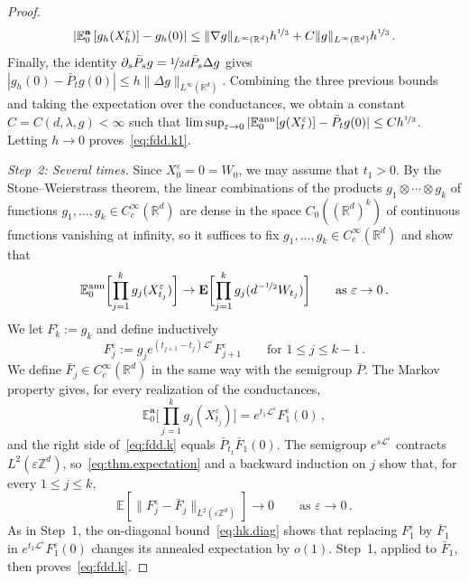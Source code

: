 \documentclass[11pt]{amsart}
\numberwithin{equation}{section}
\newcommand{\Z}{\mathbb{Z}}
\newcommand{\R}{\mathbb{R}}
\newcommand{\E}{\mathbb{E}}
\newcommand{\ba}{\mathbf{a}}
\newcommand{\eps}{\varepsilon}
\newcommand{\Leps}{\mathcal{L}^\varepsilon}
\newcommand{\nf}{\nicefrac}
\begin{document}
\begin{proof}
\begin{equation*}
    \left| \E^\ba_0 \left[ g_h(X^\eps_h) \right] - g_h(0) \right| \leq \|\nabla g\|_{L^\infty(\R^d)} h^{\nf13} + C \|g\|_{L^\infty(\R^d)} h^{\nf13}\,.
\end{equation*}
Finally, the identity $\partial_s \bar P_s g = \nf{1}{2d} \bar P_s \Delta g$ gives $|g_h(0) - \bar P_t g(0)| \leq h \|\Delta g\|_{L^\infty(\R^d)}$.
Combining the three previous bounds and taking the expectation over the conductances, we obtain a constant $C = C(d, \lambda, g) < \infty$ such that $\limsup_{\eps \to 0} | \E^{\mathrm{ann}}_0 [ g(X^\eps_t) ] - \bar P_t g(0) | \leq C h^{\nf13}$.
Letting $h \to 0$ proves~\eqref{eq:fdd.k1}.

\smallskip

\emph{Step~2: Several times.}
Since $X^\eps_0 = 0 = W_0$, we may assume that $t_1 > 0$.
By the Stone--Weierstrass theorem, the linear combinations of the products $g_1 \otimes \cdots \otimes g_k$ of functions $g_1, \ldots, g_k \in C^\infty_c(\R^d)$ are dense in the space $C_0((\R^d)^k)$ of continuous functions vanishing at infinity, so it suffices to fix $g_1, \ldots, g_k \in C^\infty_c(\R^d)$ and show that
\begin{equation} \label{eq:fdd.k}
    \E^{\mathrm{ann}}_0 \biggl[ \prod_{j=1}^k g_j(X^\eps_{t_j}) \biggr] \to \mathbf{E} \biggl[ \prod_{j=1}^k g_j(d^{-\nf12} W_{t_j}) \biggr] \qquad \text{as } \eps \to 0\,.
\end{equation}
We let $F^\eps_k := g_k$ and define inductively
\begin{equation*}
    F^\eps_j := g_j e^{(t_{j+1} - t_j) \Leps} F^\eps_{j+1} \qquad \text{for } 1 \leq j \leq k-1\,.
\end{equation*}
We define $\bar F_j \in C^\infty_c(\R^d)$ in the same way with the semigroup $\bar P$.
The Markov property gives, for every realization of the conductances,
\begin{equation*}
    \E^\ba_0 \biggl[ \prod_{j=1}^k g_j(X^\eps_{t_j}) \biggr] = e^{t_1 \Leps} F^\eps_1(0)\,,
\end{equation*}
and the right side of~\eqref{eq:fdd.k} equals $\bar P_{t_1} \bar F_1(0)$.
The semigroup $e^{s \Leps}$ contracts $L^2(\eps \Z^d)$, so~\eqref{eq:thm.expectation} and a backward induction on $j$ show that, for every $1 \leq j \leq k$,
\begin{equation*}
    \E \left[ \|F^\eps_j - \bar F_j\|_{L^2(\eps \Z^d)} \right] \to 0 \qquad \text{as } \eps \to 0\,.
\end{equation*}
As in Step~1, the on-diagonal bound~\eqref{eq:hk.diag} shows that replacing $F^\eps_1$ by $\bar F_1$ in $e^{t_1\Leps}F^\eps_1(0)$ changes its annealed expectation by $o(1)$.
Step~1, applied to $\bar F_1$, then proves~\eqref{eq:fdd.k}.
\end{proof}
\end{document}
